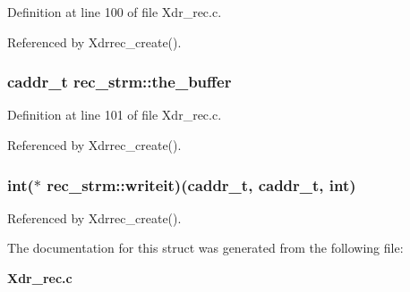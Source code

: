 Definition at line 100 of file Xdr\_\-rec.c.

Referenced by Xdrrec\_\-create().
\subsubsection{\setlength{\rightskip}{0pt plus 5cm}caddr\_\-t {\bf rec\_\-strm::the\_\-buffer}}\label{structrec__strm_o1}




Definition at line 101 of file Xdr\_\-rec.c.

Referenced by Xdrrec\_\-create().
\subsubsection{\setlength{\rightskip}{0pt plus 5cm}int($\ast$ {\bf rec\_\-strm::writeit})(caddr\_\-t, caddr\_\-t, int)}\label{structrec__strm_o2}




Referenced by Xdrrec\_\-create().

The documentation for this struct was generated from the following file:\begin{CompactItemize}
\item 
{\bf Xdr\_\-rec.c}\end{CompactItemize}

